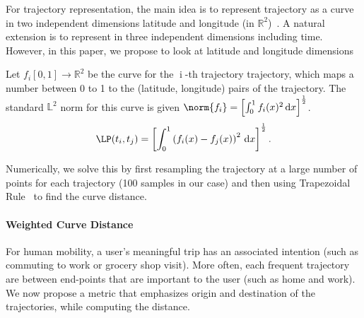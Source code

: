 For trajectory representation, the main idea is to represent trajectory as a curve in two independent dimensions latitude and longitude (in $\mathbb{R}^2$)~\cite{Kurtek2012}. A natural extension is to represent in three independent dimensions including time. However, in this paper, we propose to look at latitude and longitude dimensions %

Let $f_i[0,1] \rightarrow \mathbb{R}^2$ be the curve for the $\operatorname{i}$-th trajectory trajectory, which maps a number between 0 to 1 to the (latitude, longitude) pairs of the trajectory. The standard $\mathbb{L}^2$ norm for this curve is given $\norm{f_i} = \left[ \int_{0}^{1}{f_i(x)^2\, \mathrm{d}x }\right] ^ {\frac{1}{2}}$. %
\begin{align}
\LP(t_i,t_j) = \left[ \int_{0}^{1}{\left(f_i(x) - f_j(x) \right )^2\, \mathrm{d}x }\right] ^ {\frac{1}{2}}.
\end{align}

Numerically, we solve this by first resampling the trajectory at a large number of points for each trajectory (100 samples in our case) and then using Trapezoidal Rule~\cite{trapez} to find the curve distance. %

\paragraph{Weighted Curve Distance} For human mobility, a user's meaningful trip has an associated intention (such as commuting to work or grocery shop visit). More often, each frequent trajectory are between end-points that are important to the user (such as home and work). We now propose a metric that emphasizes origin and destination of the trajectories, while computing the distance. 

